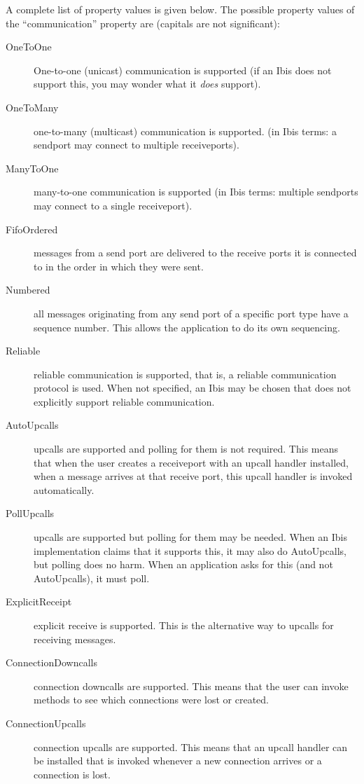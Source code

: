 \documentclass[10pt]{article}
\begin{document}
A complete list of property values is given below.
The possible property values of the ``communication'' property are
(capitals are not significant):
\begin{description}
\item[OneToOne]
One-to-one (unicast) communication is supported (if an Ibis does not support
this, you may wonder what it \emph{does} support).
\item[OneToMany]
one-to-many (multicast) communication is supported.
(in Ibis terms: a sendport
may connect to multiple receiveports).
\item[ManyToOne]
many-to-one communication is supported (in Ibis terms: multiple
sendports may connect to a single receiveport).
\item[FifoOrdered]
messages from a send port are delivered to the receive ports it is
connected to in the order in which they were sent.
\item[Numbered]
all messages originating from any send port of a specific port type have
a sequence number. This allows the application to do its own sequencing.
\item[Reliable]
reliable communication is supported, that is,
a reliable communication protocol is used.
When not specified, an Ibis may be chosen that does not explicitly
support reliable communication.
\item[AutoUpcalls]
upcalls are supported and polling for them is not required.
This means that when the user creates a receiveport with an upcall
handler installed, when a message arrives at that receive port, 
this upcall handler is invoked automatically.
\item[PollUpcalls]
upcalls are supported but polling for them may be needed. When an
Ibis implementation claims that it supports this, it may also do
AutoUpcalls, but polling does no harm. When an application asks for
this (and not AutoUpcalls), it must poll.
\item[ExplicitReceipt]
explicit receive is supported.
This is the alternative way to upcalls for receiving messages.
\item[ConnectionDowncalls]
connection downcalls are supported. This means that the user can
invoke methods to see which connections were lost or created.
\item[ConnectionUpcalls]
connection upcalls are supported. This means that an upcall
handler can be installed that is invoked whenever a new connection arrives
or a connection is lost.
\end{description}
\end{document}
